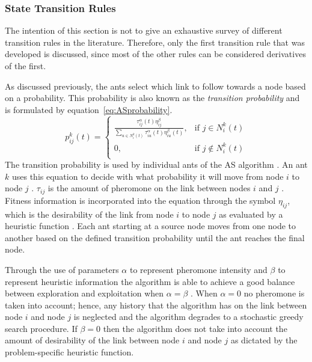\subsubsection{State Transition Rules}
\label{sec:STR}
The intention of this section is not to give an exhaustive survey of different transition rules in the literature. Therefore, only the first transition rule that was developed is discussed, since most of the other rules can be considered derivatives of the first. 

 As discussed previously, the ants select which link to follow towards a node based on a probability. This probability is also known as the \emph{transition probability} and is formulated by equation~\ref{eq:ASprobability}.
\begin{equation}
\label{eq:ASprobability}
p^k_{ij}(t) =
\begin{cases}
	\frac{\tau^{\alpha}_{ij}(t)\eta^{\beta}_{ij}}{\sum_{u \in N^k_i(t)} {\tau^{\alpha}_{iu}(t)\eta^{\beta}_{iu}(t)}}, &\text{if $j \in N^k_i(t)$}\\
	0, &\text{if $j \notin N^k_i(t)$}\\
\end{cases}
\end{equation}
The transition probability is used by individual ants of the \gls{AS} algorithm \cite{AntQAP,FundamentalSwarm}. An ant $k$ uses this equation to decide with what probability it will move from node $i$ to node $j$ \cite{CompuIntelligenceIntro,ACOLargeProblem}. $\tau_{ij}$ is the amount of pheromone on the link between nodes $i$ and $j$ \cite{AntsAndStigmergy,ACOLargeProblem}. Fitness information is incorporated into the equation through the symbol $\eta_{ij}$, which is the desirability of the link from node $i$ to node $j$ as evaluated by a heuristic function \cite{AntsAndStigmergy,ACOLargeProblem}. 
Each ant starting at a source node moves from one node to another based on the defined transition probability until the ant reaches the final node.

Through the use of parameters $\alpha$ to represent pheromone intensity and $\beta$ to represent heuristic information the algorithm is able to achieve a good balance between exploration and exploitation when $\alpha=\beta$ \cite{ACOLargeProblem,AntQAP}. When $\alpha = 0$ no pheromone is taken into account; hence, any history that the algorithm has on the link between node $i$ and node $j$ is neglected and the algorithm degrades to a stochastic greedy search procedure. If $\beta = 0$ then the algorithm does not take into account the amount of desirability of the link between node $i$ and node $j$ as dictated by the problem-specific heuristic function.

